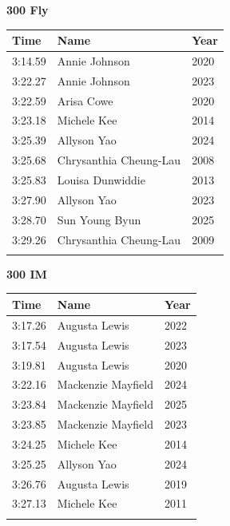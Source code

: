 \vspace{0.5em}
\noindent\begin{minipage}[t]{0.48\textwidth}
\centering
\textbf{\textcolor{teamprimary}{300 Fly}}\par
\vspace{0.5em}
\centering
\small
\renewcommand{\arraystretch}{1.0}
\setlength{\tabcolsep}{4pt}
\begin{tabular}{@{}p{1.8cm}p{3.0cm}p{1.0cm}@{}}
\toprule
\textbf{Time} & \textbf{Name} & \textbf{Year} \\
\midrule
3:14.59 & Annie Johnson & 2020 \\
3:22.27 & Annie Johnson & 2023 \\
3:22.59 & Arisa Cowe & 2020 \\
3:23.18 & Michele Kee & 2014 \\
3:25.39 & Allyson Yao & 2024 \\
3:25.68 & Chrysanthia Cheung-Lau & 2008 \\
3:25.83 & Louisa Dunwiddie & 2013 \\
3:27.90 & Allyson Yao & 2023 \\
3:28.70 & Sun Young Byun & 2025 \\
3:29.26 & Chrysanthia Cheung-Lau & 2009 \\
\bottomrule
\vspace{0.5em}
\end{tabular}
\end{minipage}
\hfill
\begin{minipage}[t]{0.48\textwidth}
\centering
\textbf{\textcolor{teamprimary}{300 IM}}\par
\vspace{0.5em}
\centering
\small
\renewcommand{\arraystretch}{1.0}
\setlength{\tabcolsep}{4pt}
\begin{tabular}{@{}p{1.8cm}p{3.0cm}p{1.0cm}@{}}
\toprule
\textbf{Time} & \textbf{Name} & \textbf{Year} \\
\midrule
3:17.26 & Augusta Lewis & 2022 \\
3:17.54 & Augusta Lewis & 2023 \\
3:19.81 & Augusta Lewis & 2020 \\
3:22.16 & Mackenzie Mayfield & 2024 \\
3:23.84 & Mackenzie Mayfield & 2025 \\
3:23.85 & Mackenzie Mayfield & 2023 \\
3:24.25 & Michele Kee & 2014 \\
3:25.25 & Allyson Yao & 2024 \\
3:26.76 & Augusta Lewis & 2019 \\
3:27.13 & Michele Kee & 2011 \\
\bottomrule
\vspace{0.5em}
\end{tabular}
\end{minipage}
